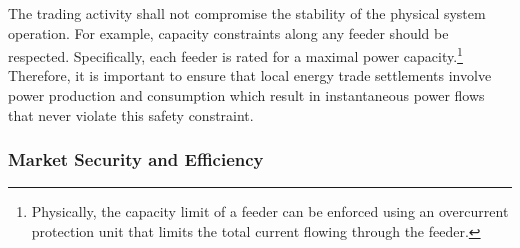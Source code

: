 The trading activity shall not compromise the stability of the physical system operation. For example, capacity constraints along any feeder should be respected. Specifically, each feeder is rated for a maximal power capacity.\footnote{Physically, the capacity limit of a feeder can be enforced using an overcurrent protection unit that limits the total current flowing through the feeder.} Therefore, it is important to ensure that local energy trade settlements involve power production and consumption which result in instantaneous power flows that never violate this safety constraint.


\subsubsection{Market Security and Efficiency}

